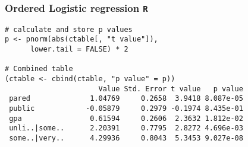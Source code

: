 \documentclass[00-GLMregslides.tex]{subfiles}
\begin{document}
\begin{frame}[fragile]
	\frametitle{Ordered Logistic regression \texttt{R} }
\normalsize	
	\begin{verbatim}
# calculate and store p values
p <- pnorm(abs(ctable[, "t value"]), 
      lower.tail = FALSE) * 2

# Combined table
(ctable <- cbind(ctable, "p value" = p))
                      Value Std. Error t value   p value
 pared              1.04769     0.2658  3.9418 8.087e-05
 public            -0.05879     0.2979 -0.1974 8.435e-01
 gpa                0.61594     0.2606  2.3632 1.812e-02
 unli..|some..      2.20391     0.7795  2.8272 4.696e-03
 some..|very..      4.29936     0.8043  5.3453 9.027e-08
\end{verbatim}

\end{frame} 

\end{document}
